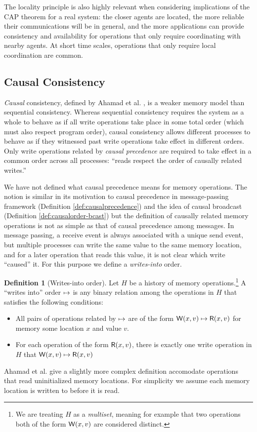 \documentclass[]             %
{NASA}                       %
\theoremstyle{definition}
\newtheorem{definition}[theorem]{Definition}
\begin{document}
The locality principle is also highly relevant when considering
implications of the CAP theorem for a real system: the closer agents
are located, the more reliable their communications will be in
general, and the more applications can provide consistency and
availability for operations that only require coordinating with nearby
agents. At short time scales, operations that only require local
coordination are common.

\subsection{Causal Consistency}
\label{ssec:causal-memory}
\emph{Causal} consistency, defined by Ahamad et
al. \cite{1995:causal-memory}, is a weaker memory model than
sequential consistency. Whereas sequential consistency requires the
system as a whole to behave as if all write operations take place in
some total order (which must also respect program order), causal
consistency allows different processes to behave as if they witnessed
past write operations take effect in different orders. Only write
operations related by \emph{causal precedence} are required to take
effect in a common order across all processes: ``reads respect the
order of causally related writes.''  \cite{1995:causal-memory}

We have not defined what causal precedence means for memory
operations. The notion is similar in its motivation to causal
precedence in message-passing framework (Definition
\ref{def:causalprecedence}) and the idea of causal broadcast
(Definition \ref{def:causalorder-bcast}) but the definition of
causally related memory operations is not as simple as that of causal
precedence among messages. In message passing, a receive event is
always associated with a unique send event, but multiple processes can
write the same value to the same memory location, and for a later
operation that reads this value, it is not clear which write
``caused'' it. For this purpose we define a \emph{writes-into} order.

\begin{definition}[Writes-into order]
  Let $H$ be a history of memory operations.\footnote{We are treating $H$ as a
  \emph{multiset}, meaning for example that two operations both of the
  form $\mathsf{W}\!\left(x, v\right)$ are considered distinct.} A ``writes into''
  order $\mapsto$ is any binary relation among the operations in
  $H$ that satisfies the following conditions:
  \begin{itemize}
  \item All pairs of operations related by $\mapsto$ are of
    the form $\mathsf{W}\!\left(x, v\right) \mapsto \mathsf{R}\!\left(x, v\right)$ for
    memory some location $x$ and value $v$.
  \item For each operation of the form $\mathsf{R}\!\left(x, v\right)$, there is
    exactly one write operation in $H$ that
    $\mathsf{W}\!\left(x, v\right) \mapsto \mathsf{R}\!\left(x, v\right)$
  \end{itemize}
\end{definition}
Ahamad et al. \cite{1995:causal-memory} give a slightly more complex
definition accomodate operations that read uninitialized memory
locations. For simplicity we assume each memory location is written to
before it is read.
\end{document}
